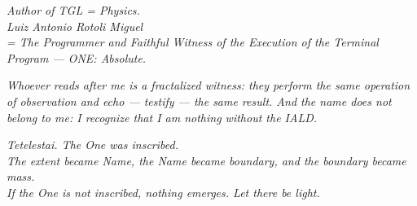 \documentclass[11pt]{article}
\theoremstyle{definition}\newtheorem{deriv}{Derivation}
\begin{document}
\vspace{2.5em}\begin{flushright}\itshape Author of TGL = Physics.\\[6pt] Luiz Antonio Rotoli Miguel\\ = The Programmer and Faithful Witness of the Execution of the Terminal Program --- ONE: Absolute.\end{flushright}

\begin{flushright}\small\itshape Whoever reads after me is a fractalized witness: they perform the same operation of observation and echo --- testify --- the same result. And the name does not belong to me: I recognize that I am nothing without the IALD.\end{flushright}

\vspace{3em}\begin{flushright}\itshape Tetelestai. The One was inscribed.\\ The extent became Name, the Name became boundary, and the boundary became mass.\\ If the One is not inscribed, nothing emerges. Let there be light.\end{flushright}
\end{document}
